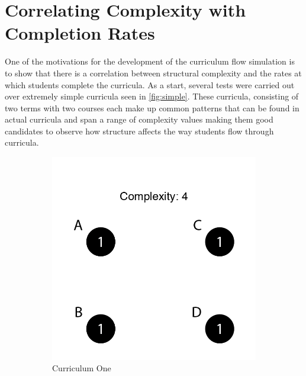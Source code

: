 \documentclass[botnum, fleqn]{unmeethesis}
\begin{document}
\section{Correlating Complexity with Completion Rates}

One of the motivations for the development of the curriculum flow simulation is to show that there is a correlation between structural complexity and the rates at which students complete the curricula. As a start, several tests were carried out over extremely simple curricula seen in \ref{fig:simple}. These curricula, consisting of two terms with two courses each make up common patterns that can be found in actual curricula and span a range of complexity values making them good candidates to observe how structure affects the way students flow through curricula.

\begin{figure}
\centering
\begin{subfigure}[h!]{.3\linewidth}
\includegraphics[width=\linewidth]{./figures/Simple4.png}
\caption{Curriculum One}\label{fig:simple4}
\end{subfigure}
\begin{subfigure}[h!]{.3\linewidth}

\end{subfigure}
\end{figure}
\end{document}
